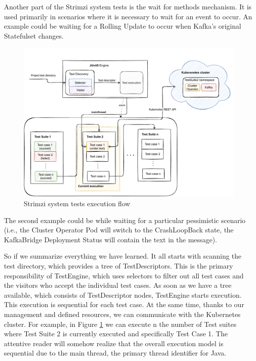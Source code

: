 Another part of the Strimzi system tests is the wait for methods mechanism. It is used primarily in scenarios where it is necessary to wait for an event to occur. An example could be waiting for a Rolling Update to occur when Kafka's original Statefulset changes. \begin{figure}[!ht]
    \centering
    \includegraphics[scale=0.70]{obrazky-figures/02-preliminaries/04-strimzi-system-tests/02d-strimzisystemtest-sequence-execution.pdf}
    \caption{Strimzi system tests execution flow}
    \label{02d:fig:strimzisysmtetest:execution}
\end{figure}
The second example could be while waiting for a particular pessimistic scenario (i.e., the Cluster Operator Pod will switch to the CrashLoopBack state, the KafkaBridge Deployment Status will contain the text in the message).

So if we summarize everything we have learned. It all starts with scanning the test directory, which provides a tree of TestDescriptors. This is the primary responsibility of TestEngine, which uses selectors to filter out all test cases and the visitors who accept the individual test cases. As soon as we have a tree available, which consists of TestDescriptor nodes, TestEngine starts execution. This execution is sequential for each test case. At the same time, thanks to our management and defined resources, we can communicate with the Kubernetes cluster. For example, in Figure \ref{02d:fig:strimzisysmtetest:execution} we can execute n the number of Test suites where Test Suite 2 is currently executed and specifically Test Case 1. The attentive reader will somehow realize that the overall execution model is sequential due to the main thread, the primary thread identifier for Java.